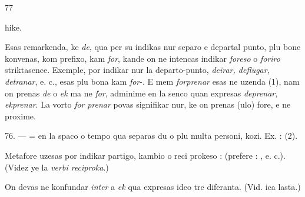 \begin{VUpage}[81]{77}

\VUcontinue
hike. \nl
{}

Esas remarkenda, ke \textit{de}, qua per su indikas nur separo\nl
e departal punto, plu bone konvenas, kom prefixo, kam \textit{for},\nl
kande on ne intencas indikar \textit{foreso} o \textit{foriro} striktasence.\nl
Exemple, por indikar nur la departo-punto, \textit{deirar, deflugar,}\nl
\textit{detranar}, e. c., esas plu bona kam \textit{for}-. E mem \textit{forprenar} esas\nl
ne uzenda (1), nam on prenas \textit{de} o \textit{ek} ma ne \textit{for}, adminime\nl
en la senco quan expresas \textit{deprenar, ekprenar}. La vorto \textit{for}\cc
\textit{prenar} povas signifikar nur, ke on prenas (ulo) fore, e ne\nl
proxime.

\VUblanc{5.80pt}%
76. ---  = en la spaco o tempo qua separas du o\nl
plu multa personi, kozi. Ex. : \nl
{}\nl
{} (2).

Metafore  uzesas por indikar partigo, kambio o reci\cc
prokeso : \nl
{} (prefere : \nl
{}, e. c.). (Videz ye la \textit{verbi reciproka}.)

On devas ne konfundar \textit{inter} a \textit{ek} qua expresas ideo tre\nl
diferanta. (Vid. ica lasta.)


\end{VUpage}
